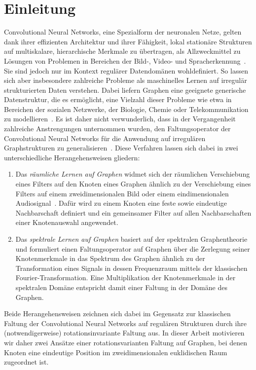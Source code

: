 \chapter{Einleitung}
\label{einleitung}

Convolutional Neural Networks, eine Spezialform der neuronalen Netze, gelten dank ihrer effizienten Architektur und ihrer Fähigkeit, lokal stationäre Strukturen auf multiskalare, hierarchische Merkmale zu übertragen, als Allzweckmittel zu Lösungen von Problemen in Bereichen der Bild-, Video- und Spracherkennung~\cite{Defferrard}.
Sie sind jedoch nur im Kontext regulärer Datendomänen wohldefiniert.
So lassen sich aber insbesondere zahlreiche Probleme als maschinelles Lernen auf irregulär strukturierten Daten verstehen.
Dabei liefern Graphen eine geeignete generische Datenstruktur, die es ermöglicht, eine Vielzahl dieser Probleme wie etwa in Bereichen der sozialen Netzwerke, der Biologie, Chemie oder Telekommunikation zu modellieren~\cite{Shuman}.
Es ist daher nicht verwunderlich, dass in der Vergangenheit zahlreiche Anstrengungen unternommen wurden, den Faltungsoperator der Convolutional Neural Networks für die Anwendung auf irregulären Graphstrukturen zu generalisieren~\cite{patchy, Defferrard, gcn}.
Diese Verfahren lassen sich dabei in zwei unterschiedliche Herangehensweisen gliedern:
\begin{enumerate}
  \item Das \emph{räumliche Lernen auf Graphen} widmet sich der räumlichen Verschiebung eines Filters auf den Knoten eines Graphen ähnlich zu der Verschiebung eines Filters auf einem zweidimensionalen Bild oder einem eindimensionalen Audiosignal~\cite{patchy}.
  Dafür wird zu einem Knoten eine feste sowie eindeutige Nachbarschaft definiert und ein gemeinsamer Filter auf allen Nachbarschaften einer Knotenauswahl angewendet.
  \item Das \emph{spektrale Lernen auf Graphen} basiert auf der spektralen Graphentheorie und formuliert einen Faltungsoperator auf Graphen über die Zerlegung seiner Knotenmerkmale in das Spektrum des Graphen ähnlich zu der Transformation eines Signals in dessen Frequenzraum mittels der klassischen Fourier-Transformation.
  Eine Multiplikation der Knotenmerkmale in der spektralen Domäne entspricht damit einer Faltung in der Domäne des Graphen.
\end{enumerate}
Beide Herangehensweisen zeichnen sich dabei im Gegensatz zur klassischen Faltung der Convolutional Neural Networks auf regulären Strukturen durch ihre (notwendigerweise) rotationsinvariante Faltung aus.
In dieser Arbeit motivieren wir daher zwei Ansätze \bzgl{} einer rotationsvarianten Faltung auf Graphen, bei denen Knoten eine eindeutige Position im zweidimensionalen euklidischen Raum zugeordnet ist.




